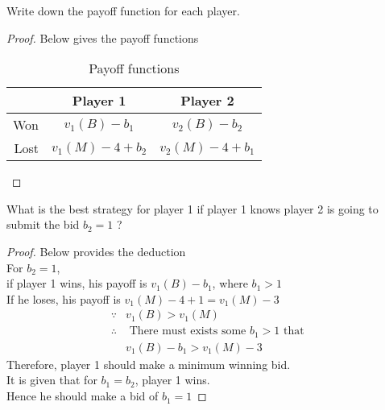 \documentclass[12pt]{article}
\newenvironment{question}[2][Question]{\begin{trivlist}
\item[\hskip \labelsep {\bfseries #1}\hskip \labelsep {\bfseries #2.}]}{\end{trivlist}}
\begin{document}
\begin{question}{2a}
	Write down the payoff function for each player.
\end{question}
\begin{proof}
	Below gives the payoff functions
	\begin{table}[h!]
		\begin{center}
			\caption{Payoff functions}
			\label{tab:table4}
			\begin{tabular}{r|c|c}

				     & Player 1       & Player 2       \\
				\hline
				Won  & $v_1(B)-b_1$   & $v_2(B)-b_2$   \\
				Lost & $v_1(M)-4+b_2$ & $v_2(M)-4+b_1$ \\
			\end{tabular}
		\end{center}
	\end{table}
\end{proof}

\begin{question}{2b}
	What is the best strategy for player 1 if player 1 knows player 2 is going to submit the bid $b_2 =1$ ?
\end{question}
\begin{proof}
	Below provides the deduction \\
	For $b_2=1$, \\
	if player 1 wins, his payoff is $v_1(B)-b_1$, where $b_1>1$ \\
	If he loses, his payoff is $v_1(M)-4+1=v_1(M)-3$
	\begin{align*}
		\because   & v_1(B) > v_1(M)                                   \\
		\therefore & \text{ There must exists some }b_1>1\text{ that } \\
		           & v_1(B)-b_1  >v_1(M)-3
	\end{align*}
	Therefore, player 1 should make a minimum winning bid.\\
	It is given that for $b_1=b_2$, player 1 wins.\\
	Hence he should make a bid of $b_1=1$
\end{proof}
\end{document}
